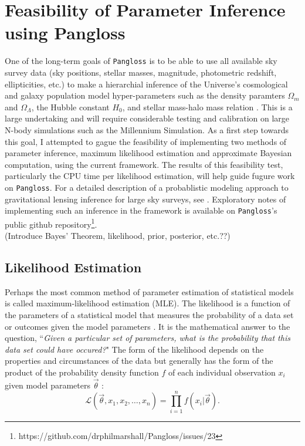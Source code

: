 \documentclass[%
 reprint,
 amsmath,amssymb,
 aps,nofootinbib
]{revtex4-1}
\begin{document}
\section{Feasibility of Parameter Inference using Pangloss} \label{feasibility}

One of the long-term goals of \texttt{Pangloss} is to be able to use all available sky survey data (sky positions, stellar masses, magnitude, photometric redshift, ellipticities, etc.) to make a hierarchial inference of the Universe's cosmological and galaxy population model hyper-parameters such as the density paramters $\Omega_m$ and $\Omega_\Lambda$, the Hubble constant $H_0$, and stellar mass-halo mass relation \cite{smhr}. This is a large undertaking and will require considerable testing and calibration on large N-body simulations such as the Millennium Simulation. As a first step towards this goal, I attempted to gague the feasibility of implementing two methods of parameter inference, maximum likelihood estimation and approximate Bayesian computation, using the current framework. The results of this feasibility test, particularly the CPU time per likelihood estimation, will help guide fugure work on \texttt{Pangloss}. For a detailed description of a probablistic modeling approach to gravitational lensing inference for large sky surveys, see \cite{grav_lens_inference}. Exploratory notes of implementing such an inference in the framework is available on \texttt{Pangloss}'s public github repository\footnote{https://github.com/drphilmarshall/Pangloss/issues/23}.\\

(Introduce Bayes' Theorem, likelihood, prior, posterior, etc.??)


\subsection{Likelihood Estimation} \label{mle}

Perhaps the most common method of parameter estimation of statistical models is called maximum-likelihood estimation (MLE). The likelihood is a function of the parameters of a statistical model that measures the probability of a data set or outcomes given the model parameters \cite{??}. It is the mathematical answer to the question, ``\textit{Given a particular set of parameters, what is the probability that this data set could have occured?}" The form of the likelihood depends on the properties and circumstances of the data but generally has the form of the product of the probability density function $f$ of each individual observation $x_i$ given model parameters $\vec{\theta}$ \cite{likelihood}:
\begin{equation}
\mathcal{L}(\vec{\theta},x_1,x_2,\ldots,x_n)=\prod_{i=1}^nf(x_i|\vec{\theta}).
\end{equation}
\end{document}
